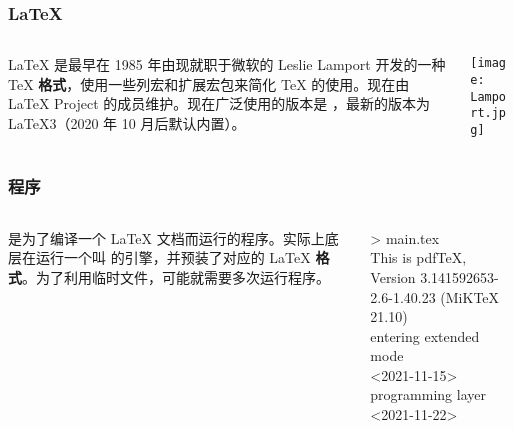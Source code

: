{\begin{frame}
  \frametitle{\LaTeX{}}
  \begin{columns}[c]
    \begin{column}{0.7\textwidth}
      \begin{center}
        \rmfamily\Huge
        \highlight[structure]{\LaTeX{}}
      \end{center}
      \begin{center}
        \parbox{0.75\textwidth}{
          \LaTeX{} 是最早在 1985 年由现就职于微软的 Leslie Lamport 开发的一种 \TeX{} \textbf{格式}\footnotemark，使用一些列宏和扩展宏包来简化 \TeX{} 的使用。现在由 \LaTeX{} Project 的成员维护。现在广泛使用的版本是 \LaTeXe{}，最新的版本为 \LaTeX3（2020 年 10 月后默认内置）。
        }
      \end{center}
    \end{column}
    \begin{column}{0.3\textwidth}
      \texttt{[image: Lamport.jpg]}
    \end{column}
  \end{columns}
\end{frame}

\begin{frame}
  \frametitle{程序}
  \begin{columns}[c]
    \begin{column}{0.7\textwidth}
      \begin{center}
        \rmfamily\Huge
      \end{center}
      \begin{center}
        \parbox{0.7\textwidth}{
           是为了编译一个 \LaTeX{} 文档而运行的程序。实际上底层在运行一个叫  的引擎，并预装了对应的 \LaTeX{} \textbf{格式}。为了利用临时文件，可能就需要多次运行程序。
        }
      \end{center}
    \end{column}
    \begin{column}{0.3\textwidth}
      \begin{block}{}
        \ttfamily\small
        >  main.tex\\
        This is pdfTeX, Version 3.141592653-
        2.6-1.40.23 (MiKTeX 21.10)\\
        entering extended mode\\
         <2021-11-15>\\
         programming layer <2021-11-22>
      \end{block}
    \end{column}
  \end{columns}
\end{frame}

}
